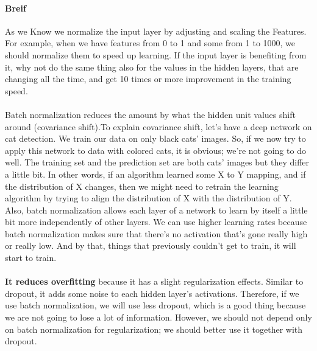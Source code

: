 
\paragraph{Breif}
As we Know we normalize the input layer by adjusting and scaling the Features. For example, when we have features from 0 to 1 and some from 1 to 1000, we should normalize them to speed up learning. If the input layer is benefiting from it, why not do the same thing also for the values in the hidden layers, that are changing all the time, and get 10 times or more improvement in the training speed.
\paragraph{}
Batch normalization reduces the amount by what the hidden unit values shift around (covariance shift).To explain covariance shift, let’s have a deep network on cat detection. We train our data on only black cats’ images. So, if we now try to apply this network to data with colored cats, it is obvious; we’re not going to do well. The training set and the prediction set are both cats’ images but they differ a little bit. In other words, if an algorithm learned some X to Y mapping, and if the distribution of X changes, then we might need to retrain the learning algorithm by trying to align the distribution of X with the distribution of Y.
Also, batch normalization allows each layer of a network to learn by itself a little bit more independently of other layers.
We can use higher learning rates because batch normalization makes sure that there’s no activation that’s gone really high or really low. And by that, things that previously couldn’t get to train, it will start to train.

\paragraph{}
\textbf{It reduces overfitting}
because it has a slight regularization effects. Similar to dropout, it adds some noise to each hidden layer’s activations. Therefore, if we use batch normalization, we will use less dropout, which is a good thing because we are not going to lose a lot of information. However, we should not depend only on batch normalization for regularization; we should better use it together with dropout.